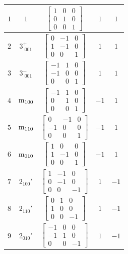 \documentclass[fleqn,8pt]{jsarticle}
\begin{document}
\begin{longtable}{ccccc}
$ 1 $ & $ 1 $ & $ \begin{bmatrix} 1 & 0 & 0 \\ 0 & 1 & 0 \\ 0 & 0 & 1 \end{bmatrix} $ & $ 1 $ & $ 1 $ \\ \hline
$ 2 $ & $ 3^{+}_{\,\,001} $ & $ \begin{bmatrix} 0 & -1 & 0 \\ 1 & -1 & 0 \\ 0 & 0 & 1 \end{bmatrix} $ & $ 1 $ & $ 1 $ \\ \hline
$ 3 $ & $ 3^{-}_{\,\,001} $ & $ \begin{bmatrix} -1 & 1 & 0 \\ -1 & 0 & 0 \\ 0 & 0 & 1 \end{bmatrix} $ & $ 1 $ & $ 1 $ \\ \hline
$ 4 $ & $ {\rm m}_{100} $ & $ \begin{bmatrix} -1 & 1 & 0 \\ 0 & 1 & 0 \\ 0 & 0 & 1 \end{bmatrix} $ & $ -1 $ & $ 1 $ \\ \hline
$ 5 $ & $ {\rm m}_{110} $ & $ \begin{bmatrix} 0 & -1 & 0 \\ -1 & 0 & 0 \\ 0 & 0 & 1 \end{bmatrix} $ & $ -1 $ & $ 1 $ \\ \hline
$ 6 $ & $ {\rm m}_{010} $ & $ \begin{bmatrix} 1 & 0 & 0 \\ 1 & -1 & 0 \\ 0 & 0 & 1 \end{bmatrix} $ & $ -1 $ & $ 1 $ \\ \hline
$ 7 $ & $ 2{}_{100}{}' $ & $ \begin{bmatrix} 1 & -1 & 0 \\ 0 & -1 & 0 \\ 0 & 0 & -1 \end{bmatrix} $ & $ 1 $ & $ -1 $ \\ \hline
$ 8 $ & $ 2{}_{110}{}' $ & $ \begin{bmatrix} 0 & 1 & 0 \\ 1 & 0 & 0 \\ 0 & 0 & -1 \end{bmatrix} $ & $ 1 $ & $ -1 $ \\ \hline
$ 9 $ & $ 2{}_{010}{}' $ & $ \begin{bmatrix} -1 & 0 & 0 \\ -1 & 1 & 0 \\ 0 & 0 & -1 \end{bmatrix} $ & $ 1 $ & $ -1 $ \\ \hline

\end{longtable}
\end{document}
